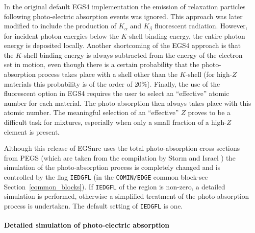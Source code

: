 In the original default EGS4 implementation the emission of relaxation 
particles following photo-electric absorption events was 
ignored. This approach was later modified 
to include the production of $K_\alpha$ and $K_\beta$ fluorescent 
radiation. However, for incident photon energies below 
the $K$-shell binding energy, the entire photon energy is 
deposited locally. Another shortcoming of the EGS4 approach is 
that the $K$-shell binding energy is always subtracted 
from the energy of the electron set in motion, even though there 
is a certain probability that the photo-absorption process 
takes place with a shell other than the $K$-shell (for 
high-$Z$ materials this probability is of the order of 20\%). 
Finally, the use of the fluorescent option in EGS4 requires 
the user to select an ``effective'' atomic number for each 
material. The photo-absorption then always takes place with 
this atomic number. The meaningful selection of an 
``effective'' $Z$ proves to be a difficult task for mixtures, especially 
when only a small fraction of a high-$Z$ element is present.

Although this release of EGSnrc uses the total photo-absorption 
cross sections from PEGS (which are taken from the 
compilation by Storm and Israel \cite{SI70}) 
the simulation of the photo-absorption process 
is completely changed and is controlled 
by the flag {\tt IEDGFL}
(in the {\tt COMIN/EDGE} common block-see Section~\ref{common_blocks}). If {\tt IEDGFL} of the 
region is non-zero, a detailed simulation is performed, 
otherwise a simplified treatment of the photo-absorption process 
is undertaken. The default setting of {\tt IEDGFL} is one. 

\paragraph{Detailed simulation of photo-electric absorption}\hfill
\label{photo_detailed}

